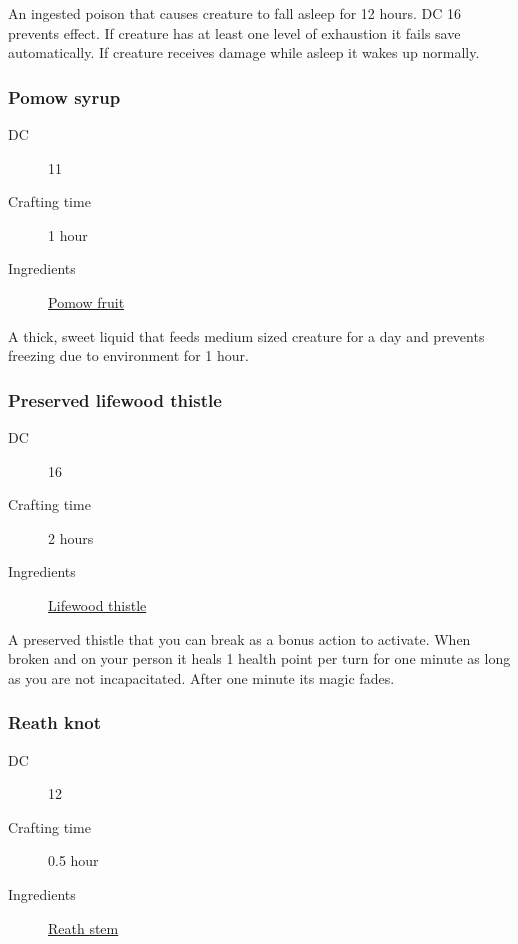 An ingested poison that causes creature to fall asleep for 12 hours. DC 16 \constitutionsave prevents effect. 
If creature has at least one level of exhaustion it fails save automatically. 
If creature receives damage while asleep it wakes up normally.

\subsubsection{Pomow syrup}
\label{Pomow syrup}

\begin{description}
\item [DC] 11 \survival
\item [Crafting time] 1 hour
\item [Ingredients] \hyperref[Pomow]{Pomow fruit}
\end{description}

A thick, sweet liquid that feeds medium sized creature for a day and prevents freezing 
due to environment for 1 hour.

\subsubsection{Preserved lifewood thistle}
\label{Preserved lifewood thistle}

\begin{description}
\item [DC] 16 \medicine
\item [Crafting time] 2 hours
\item [Ingredients] \hyperref[Lifewood]{Lifewood thistle}
\end{description}

A preserved thistle that you can break as a bonus action to activate. 
When broken and on your person it heals 1 health point per turn for one minute 
as long as you are not incapacitated. After one minute its magic fades.

\subsubsection{Reath knot}
\label{Reath knot}

\begin{description}
\item [DC] 12 \medicine
\item [Crafting time] 0.5 hour
\item [Ingredients] \hyperref[Reath]{Reath stem}
\end{description}

